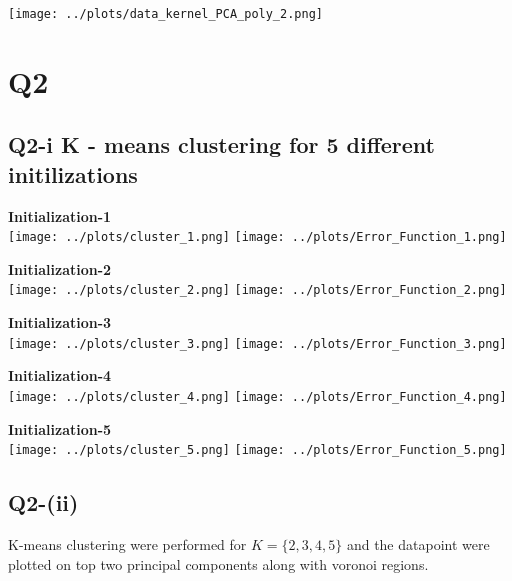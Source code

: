 \centering
\texttt{[image: ../plots/data\_kernel\_PCA\_poly\_2.png]}


\pagebreak

\raggedright

\section*{Q2}

\subsection*{Q2-{i} K - means clustering for 5 different initilizations}

\vspace*{3pt}
\textbf{Initialization-1}\\
\centering
\texttt{[image: ../plots/cluster\_1.png]}
\texttt{[image: ../plots/Error\_Function\_1.png]}\\
\raggedright

\textbf{Initialization-2}\\
\centering
\texttt{[image: ../plots/cluster\_2.png]}
\texttt{[image: ../plots/Error\_Function\_2.png]}\\
\raggedright

\textbf{Initialization-3}\\

\centering
\texttt{[image: ../plots/cluster\_3.png]}
\texttt{[image: ../plots/Error\_Function\_3.png]}\\
\raggedright

\textbf{Initialization-4}\\
\centering
\texttt{[image: ../plots/cluster\_4.png]}
\texttt{[image: ../plots/Error\_Function\_4.png]}\\
\raggedright

\textbf{Initialization-5}\\
\centering
\texttt{[image: ../plots/cluster\_5.png]}
\texttt{[image: ../plots/Error\_Function\_5.png]}\\
\raggedright

\subsection*{Q2-(ii)}

K-means clustering were performed for $K = \{2, 3, 4, 5\}$ and the datapoint were plotted on top two principal components along with voronoi regions.

